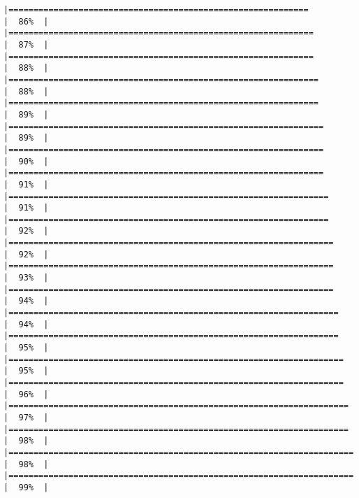 \documentclass[
]{book}
\begin{document}
\begin{verbatim}
|============================================================          |  86%  |                                                                              |=============================================================         |  87%  |                                                                              |=============================================================         |  88%  |                                                                              |==============================================================        |  88%  |                                                                              |==============================================================        |  89%  |                                                                              |===============================================================       |  89%  |                                                                              |===============================================================       |  90%  |                                                                              |===============================================================       |  91%  |                                                                              |================================================================      |  91%  |                                                                              |================================================================      |  92%  |                                                                              |=================================================================     |  92%  |                                                                              |=================================================================     |  93%  |                                                                              |=================================================================     |  94%  |                                                                              |==================================================================    |  94%  |                                                                              |==================================================================    |  95%  |                                                                              |===================================================================   |  95%  |                                                                              |===================================================================   |  96%  |                                                                              |====================================================================  |  97%  |                                                                              |====================================================================  |  98%  |                                                                              |===================================================================== |  98%  |                                                                              |===================================================================== |  99%  |                                                                              
\end{verbatim}
\end{document}
